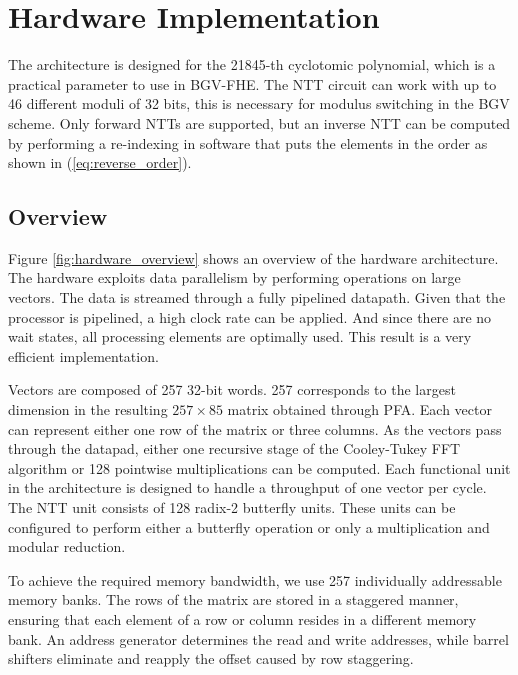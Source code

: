 \documentclass[lettersize,journal]{IEEEtran}
\begin{document}
\section{Hardware Implementation}
The architecture is designed for the 21845-th cyclotomic polynomial, which is a practical parameter to use in BGV-FHE. \cite{cryptoeprint:2014/873} The NTT circuit can work with up to 46 different moduli of 32 bits, this is necessary for modulus switching in the BGV scheme. Only forward NTTs are supported, but an inverse NTT can be computed by performing a re-indexing in software that puts the elements in the order as shown in (\ref{eq:reverse_order}). 

\subsection{Overview}

Figure \ref{fig:hardware_overview} shows an overview of the hardware architecture. The hardware exploits data parallelism by performing operations on large vectors. The data is streamed through a fully pipelined datapath. Given that the processor is pipelined, a high clock rate can be applied. And since there are no wait states, all processing elements are optimally used. This result is a very efficient implementation.

Vectors are composed of 257 32-bit words. 257 corresponds to the largest dimension in the resulting $257 \times 85$ matrix obtained through PFA. Each vector can represent either one row of the matrix or three columns. As the vectors pass through the datapad, either one recursive stage of the Cooley-Tukey FFT algorithm or 128 pointwise multiplications can be computed. Each functional unit in the architecture is designed to handle a throughput of one vector per cycle. The NTT unit consists of 128 radix-2 butterfly units. These units can be configured to perform either a butterfly operation or only a multiplication and modular reduction.

To achieve the required memory bandwidth, we use 257 individually addressable memory banks. The rows of the matrix are stored in a staggered manner, ensuring that each element of a row or column resides in a different memory bank. An address generator determines the read and write addresses, while barrel shifters eliminate and reapply the offset caused by row staggering.
\end{document}

